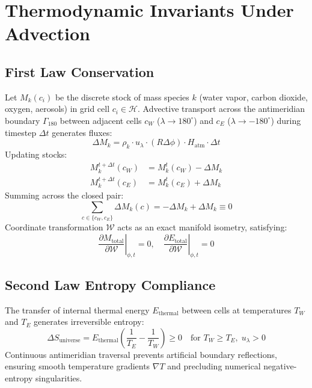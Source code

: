 \documentclass[11pt,a4paper]{article}
\theoremstyle{definition}
\begin{document}
\section{Thermodynamic Invariants Under Advection}

\subsection{First Law Conservation}
Let $M_k(c_i)$ be the discrete stock of mass species $k$ (water vapor, carbon dioxide, oxygen, aerosols) in grid cell $c_i \in \mathcal{H}$. Advective transport across the antimeridian boundary $\Gamma_{180}$ between adjacent cells $c_W$ ($\lambda \to 180^\circ$) and $c_E$ ($\lambda \to -180^\circ$) during timestep $\Delta t$ generates fluxes:
\begin{equation}
\Delta M_k = \rho_k \cdot u_\lambda \cdot (R \Delta \phi) \cdot H_{\text{atm}} \cdot \Delta t
\end{equation}
Updating stocks:
\begin{align}
M_k^{t+\Delta t}(c_W) &= M_k^t(c_W) - \Delta M_k \\
M_k^{t+\Delta t}(c_E) &= M_k^t(c_E) + \Delta M_k
\end{align}
Summing across the closed pair:
\begin{equation}
\sum_{c \in \{c_W, c_E\}} \Delta M_k(c) = -\Delta M_k + \Delta M_k \equiv 0
\end{equation}
Coordinate transformation $\mathcal{W}$ acts as an exact manifold isometry, satisfying:
\begin{equation}
\left.\frac{\partial M_{\text{total}}}{\partial \mathcal{W}}\right|_{\phi, t} = 0, \quad \left.\frac{\partial E_{\text{total}}}{\partial \mathcal{W}}\right|_{\phi, t} = 0
\end{equation}

\subsection{Second Law Entropy Compliance}
The transfer of internal thermal energy $E_{\text{thermal}}$ between cells at temperatures $T_W$ and $T_E$ generates irreversible entropy:
\begin{equation}
\Delta S_{\text{universe}} = E_{\text{thermal}} \left( \frac{1}{T_E} - \frac{1}{T_W} \right) \ge 0 \quad \text{for } T_W \ge T_E, \; u_\lambda > 0
\end{equation}
Continuous antimeridian traversal prevents artificial boundary reflections, ensuring smooth temperature gradients $\nabla T$ and precluding numerical negative-entropy singularities.
\end{document}
